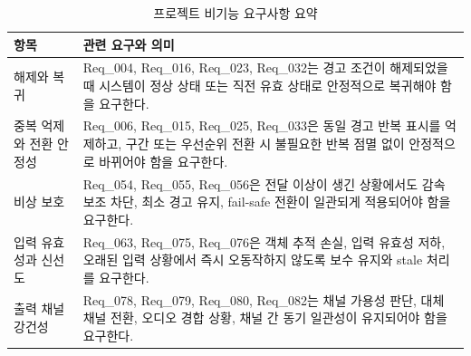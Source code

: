 \documentclass[11pt,a4paper]{article}
\begin{document}
\begin{table}[H]
\centering
\begin{tabularx}{\textwidth}{|p{34mm}|X|}
\hline
\textbf{항목} & \textbf{관련 요구와 의미} \\ \hline
해제와 복귀 & Req\_004, Req\_016, Req\_023, Req\_032는 경고 조건이 해제되었을 때 시스템이 정상 상태 또는 직전 유효 상태로 안정적으로 복귀해야 함을 요구한다. \\ \hline
중복 억제와 전환 안정성 & Req\_006, Req\_015, Req\_025, Req\_033은 동일 경고 반복 표시를 억제하고, 구간 또는 우선순위 전환 시 불필요한 반복 점멸 없이 안정적으로 바뀌어야 함을 요구한다. \\ \hline
비상 보호 & Req\_054, Req\_055, Req\_056은 전달 이상이 생긴 상황에서도 감속 보조 차단, 최소 경고 유지, fail-safe 전환이 일관되게 적용되어야 함을 요구한다. \\ \hline
입력 유효성과 신선도 & Req\_063, Req\_075, Req\_076은 객체 추적 손실, 입력 유효성 저하, 오래된 입력 상황에서 즉시 오동작하지 않도록 보수 유지와 stale 처리를 요구한다. \\ \hline
출력 채널 강건성 & Req\_078, Req\_079, Req\_080, Req\_082는 채널 가용성 판단, 대체 채널 전환, 오디오 경합 상황, 채널 간 동기 일관성이 유지되어야 함을 요구한다. \\ \hline
\end{tabularx}
\caption{프로젝트 비기능 요구사항 요약}
\end{table}
\end{document}
